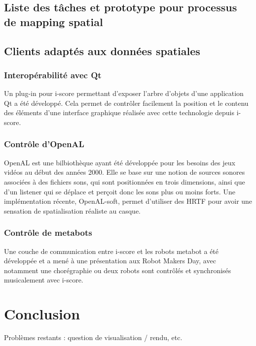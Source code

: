 \documentclass[french]{article}
\begin{document}
\subsection{Liste des tâches et prototype pour processus de mapping spatial}

\subsection{Clients adaptés aux données spatiales}
\subsubsection{Interopérabilité avec Qt}
Un plug-in pour i-score permettant d'exposer l'arbre d'objets d'une application Qt a été développé. Cela permet de contrôler facilement la position et le contenu des éléments d'une interface graphique réalisée avec cette technologie depuis i-score.

\subsubsection{Contrôle d'OpenAL}
OpenAL est une bilbiothèque ayant été développée pour les besoins des jeux vidéos au début des années 2000. Elle se base sur une notion de sources sonores associées à des fichiers sons, qui sont positionnées en trois dimensions, ainsi que d'un listener qui se déplace et perçoit donc les sons plus ou moins forts. Une implémentation récente, OpenAL-soft, permet d'utiliser des HRTF pour avoir une sensation de spatialisation réaliste au casque.  
\subsubsection{Contrôle de metabots}
Une couche de communication entre i-score et les robots metabot %
a été développée et a mené à une présentation aux Robot Makers Day, avec notamment 
une chorégraphie ou deux robots sont contrôlés et synchronisés musicalement avec i-score. 

\section{Conclusion}

Problèmes restants : question de visualisation / rendu, etc.
\end{document}
